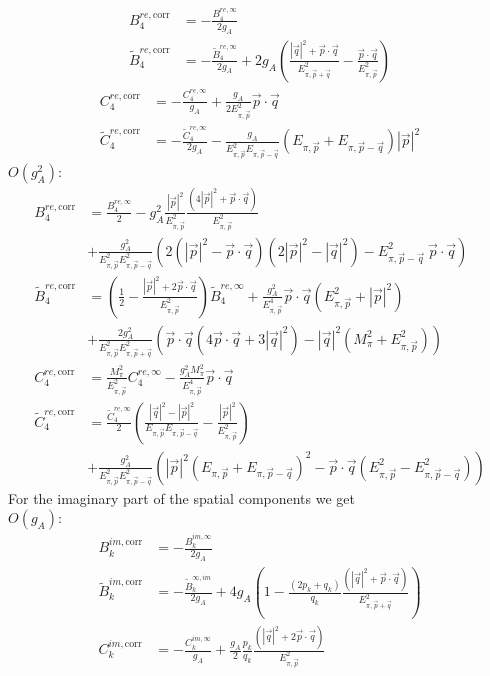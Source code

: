 \documentclass[11pt,prd,aps,showpacs,eqsecnum,floatfix,nofootinbib,preprint,tightenlines]{revtex4}
\newcommand{\Epipmq}{E_{\pi, \vec{p}-\vec{q}}}
\newcommand{\Epippq}{E_{\pi, \vec{p}+\vec{q}}}
\newcommand{\Epip}{E_{\pi, \vec{p}}}
\newcommand{\psq}{|\vec{p}|^2}
\newcommand{\qsq}{|\vec{q}|^2}
\newcommand{\pq}{\vec{p} \cdot \vec{q}}
\begin{document}
\begin{appendix}
\begin{align}
	B^{re,\text{corr}}_4 &= -\frac{ B^{re,\infty}_4}{2g_A}
	\\
	\tilde{B}^{re,\text{corr}}_4 &= - \frac{\tilde{B}^{re,\infty}_4}{2g_A} 
		+ 2g_A \left(\frac{\qsq + \pq}{\Epippq^2} - \frac{\pq}{\Epip^2} \right)
\end{align}
\begin{align}
	C^{re,\text{corr}}_4 &= -\frac{C^{re,\infty}_4}{g_A}
		+ \frac{g_A}{2\Epip^2} \pq
	\\
	\tilde{C}^{re,\text{corr}}_4 &= -\frac{\tilde{C}^{re,\infty}_4}{2 g_A}
		- \frac{g_A}{\Epip^2 \Epipmq} (\Epip + \Epipmq) \psq
\end{align}
$O(g_A^2)$:
\begin{align}
	B^{re,\text{corr}}_4 &= \frac{ B^{re,\infty}_4}{2} 
		-g_A^2 \frac{\psq}{\Epip^2} \frac{\left(4 \psq + \pq \right)}{\Epip^2}
		\\
		&+ \frac{g_A^2}{\Epip^2 \Epipmq^2} \left( 2(\psq - \pq)(2 \psq - \qsq) - \Epipmq^2 \ \pq \right)
	\nonumber \\
	\tilde{B}^{re,\text{corr}}_4 &= \left( \frac{1}{2} - \frac{\psq + 2\pq}{\Epip^2} \right) \tilde{B}^{re,\infty}_4
		+ \frac{g_A^2}{\Epip^4} \pq \left( \Epip^2 + \psq  \right) 
		\\
		&+ \frac{2g_A^2}{\Epip^2 \Epippq^2} \left( \pq ( 4 \pq + 3 \qsq ) - \qsq ( M_\pi^2 + \Epip^2)\right)
	\nonumber \\
	C^{re,\text{corr}}_4 &= \frac{M^2_\pi}{\Epip^2} C^{re,\infty}_4
		- \frac{g_A^2 M^2_\pi}{\Epip^4} \pq
	\\
	\tilde{C}^{re,\text{corr}}_4 &= \frac{\tilde{C}^{re,\infty}_4}{2} 
		\left(\frac{\qsq - \psq}{\Epip \Epipmq} - \frac{\psq}{\Epip^2} \right) \\
		&+ \frac{g_A^2}{\Epip^2 \Epipmq^2} \left( \psq (\Epip + \Epipmq)^2 - \pq (\Epip^2 - \Epipmq^2) \right) \nonumber
\end{align}
For the {imaginary} part of the {spatial} components we get\\[0.3cm]
$O(g_A)$:
\begin{align}
	B^{im,\text{corr}}_k &= -\frac{ B^{im,\infty}_k}{2g_A}
	\\
	\tilde{B}^{im,\text{corr}}_k &= -\frac{\tilde{B}^{\infty, im}_k}{2 g_A} 
		+ 4 g_A \left( 1 - \frac{(2p_k + q_k)}{q_k}\frac{(\qsq + \pq)}{\Epippq^2} \right)
	\\
	C^{im,\text{corr}}_k &= -\frac{C^{im,\infty}_k}{g_A}
		+ \frac{g_A}{2} \frac{p_k}{q_k} \frac{(\qsq + 2\pq)}{\Epip^2}
	\\

\end{align}
\end{appendix}
\end{document}
